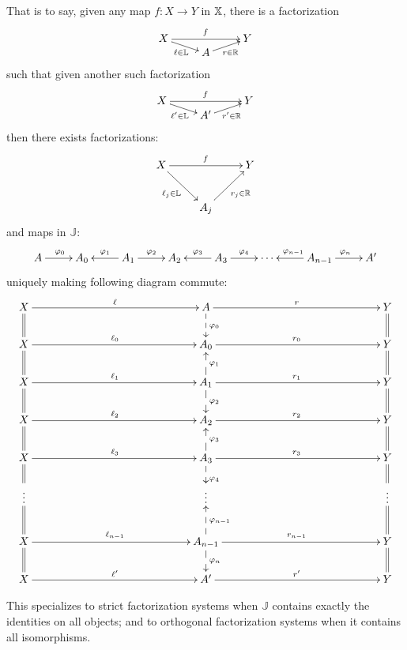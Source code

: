 \begin{definition}
That is to say, given any map $f:X\to Y$ in $\mathbb{X}$, there is a factorization
$$\xymatrixrowsep{0mm}
\xymatrix{
X  \ar[rr]^{f} \ar[dr]_{\ell \in {\mathbb L}} &       & Y\\
   & A \ar[ur]_{r \in {\mathbb R}}
}
$$\xymatrixrowsep{0mm}
such that given another such factorization
$$\xymatrixrowsep{0mm}
\xymatrix{
X  \ar[rr]^{f} \ar[dr]_{\ell' \in {\mathbb L}} &       & Y\\
   & A' \ar[ur]_{r'  \in {\mathbb R}}
}
$$
%
%
%
then there exists factorizations:
$$
\xymatrix{
X  \ar[rr]^{f} \ar[dr]_{\ell_j\in {\mathbb L}} &       & Y\\
   & A_j \ar[ur]_{r_j \in {\mathbb R}}
}
$$
and  maps in $\mathbb J$:
$$
\xymatrix{
A \ar[r]^{\phi_0}
& A_0 
& A_1 \ar[l]_{\phi_1} \ar[r]^{\phi_2}
& A_2 
& A_3 \ar[l]_{\phi_3} \ar[r]^{\phi_4}
&\cdots
& A_{n-1} \ar[l]_{\phi_{n-1}} \ar[r]^{\phi_n}
& A'
}
$$
uniquely making following diagram commute:
$$
\xymatrixrowsep{7mm}
\xymatrixcolsep{50mm}
\xymatrix{
X   \ar[r]^{\ell}\ar@{=}[d]              & A \ar@{-->}[d]^{\phi_0} \ar[r]^{r}                                               & Y \ar@{=}[d]\\
X   \ar[r]^{\ell_0}\ar@{=}[d]          & A_0  \ar[r]^{r_0}                                                                          & Y\ar@{=}[d]\\
X   \ar[r]^{\ell_1}\ar@{=}[d]           & A_1 \ar@{-->}[u]_{\phi_1} \ar@{-->}[d]^{\phi_2} \ar[r]^{r_1}  & Y \ar@{=}[d]\\
X   \ar[r]^{\ell_2}\ar@{=}[d]           & A_2 \ar[r]^{r_2}                                                                             & Y \ar@{=}[d]\\
X   \ar[r]^{\ell_3}\ar@{=}[d]         & A_ 3\ar@{-->}[u]_{\phi_3} \ar@{-->}[d]^{\phi_4}\ar[r]^{r_3}   & Y \ar@{=}[d]\\
 \vdots\ar@{=}[d]         & \vdots & \vdots \ar@{=}[d] \\
X   \ar[r]^{\ell_{n-1}}\ar@{=}[d]   & A_{n-1}  \ar@{-->}[u]_{\phi_{n-1}} \ar@{-->}[d]^{\phi_n}  \ar[r]^{r_{n-1}}         & Y    \ar@{=}[d]\\
X   \ar[r]^{\ell'}                         & A'   \ar[r]^{r'} & Y
}
$$
\end{definition}
\endgroup
This specializes to strict factorization systems when $\mathbb J$ contains exactly the identities on all objects; and to orthogonal factorization systems when it contains all isomorphisms. 
